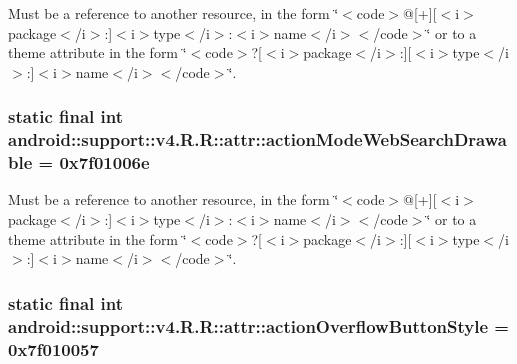 Must be a reference to another resource, in the form \char`\"{}$<$code$>$@\mbox{[}+\mbox{]}\mbox{[}$<$i$>$package$<$/i$>$:\mbox{]}$<$i$>$type$<$/i$>$:$<$i$>$name$<$/i$>$$<$/code$>$\char`\"{} or to a theme attribute in the form \char`\"{}$<$code$>$?\mbox{[}$<$i$>$package$<$/i$>$:\mbox{]}\mbox{[}$<$i$>$type$<$/i$>$:\mbox{]}$<$i$>$name$<$/i$>$$<$/code$>$\char`\"{}. \hypertarget{classandroid_1_1support_1_1v4_1_1_r_1_1attr_3994d266fb3926aa161b7bcd436a8209}{
\subsubsection[{actionModeWebSearchDrawable}]{\setlength{\rightskip}{0pt plus 5cm}static final int android::support::v4.R.R::attr::actionModeWebSearchDrawable = 0x7f01006e}}
\label{classandroid_1_1support_1_1v4_1_1_r_1_1attr_3994d266fb3926aa161b7bcd436a8209}


Must be a reference to another resource, in the form \char`\"{}$<$code$>$@\mbox{[}+\mbox{]}\mbox{[}$<$i$>$package$<$/i$>$:\mbox{]}$<$i$>$type$<$/i$>$:$<$i$>$name$<$/i$>$$<$/code$>$\char`\"{} or to a theme attribute in the form \char`\"{}$<$code$>$?\mbox{[}$<$i$>$package$<$/i$>$:\mbox{]}\mbox{[}$<$i$>$type$<$/i$>$:\mbox{]}$<$i$>$name$<$/i$>$$<$/code$>$\char`\"{}. \hypertarget{classandroid_1_1support_1_1v4_1_1_r_1_1attr_61db9aa7bab56fc26dd2abec22905ce1}{
\subsubsection[{actionOverflowButtonStyle}]{\setlength{\rightskip}{0pt plus 5cm}static final int android::support::v4.R.R::attr::actionOverflowButtonStyle = 0x7f010057}}
\label{classandroid_1_1support_1_1v4_1_1_r_1_1attr_61db9aa7bab56fc26dd2abec22905ce1}


